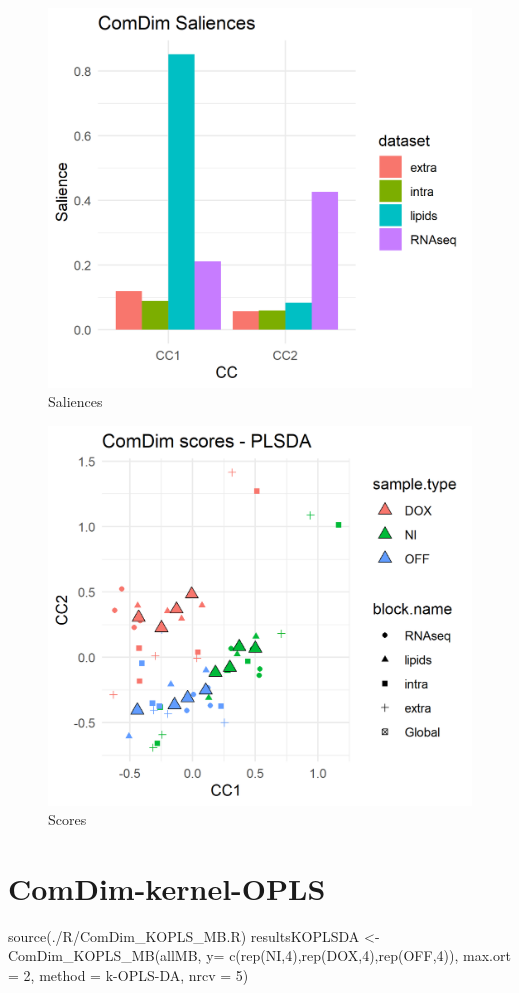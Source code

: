 \documentclass[
]{book}
\newenvironment{Shaded}{\begin{snugshade}}{\end{snugshade}}
\newcommand{\AttributeTok}[1]{\textcolor[rgb]{0.77,0.63,0.00}{#1}}
\newcommand{\DecValTok}[1]{\textcolor[rgb]{0.00,0.00,0.81}{#1}}
\newcommand{\FunctionTok}[1]{\textcolor[rgb]{0.00,0.00,0.00}{#1}}
\newcommand{\NormalTok}[1]{#1}
\newcommand{\OtherTok}[1]{\textcolor[rgb]{0.56,0.35,0.01}{#1}}
\newcommand{\StringTok}[1]{\textcolor[rgb]{0.31,0.60,0.02}{#1}}
\begin{document}
\begin{figure}

{\centering \includegraphics[width=0.5\linewidth]{Figs/fig6_1} 

}

\caption{Saliences}\label{fig:unnamed-chunk-16}
\end{figure}

\begin{figure}

{\centering \includegraphics[width=0.5\linewidth]{Figs/fig6_2} 

}

\caption{Scores}\label{fig:unnamed-chunk-17}
\end{figure}

\hypertarget{KOPLS}{%
\section{ComDim-kernel-OPLS}\label{KOPLS}}

\begin{Shaded}
\begin{Highlighting}[]
\FunctionTok{source}\NormalTok{(}\StringTok{\textquotesingle{}./R/ComDim\_KOPLS\_MB.R\textquotesingle{}}\NormalTok{)}
\NormalTok{resultsKOPLSDA }\OtherTok{\textless{}{-}} \FunctionTok{ComDim\_KOPLS\_MB}\NormalTok{(allMB, }\AttributeTok{y=} \FunctionTok{c}\NormalTok{(}\FunctionTok{rep}\NormalTok{(}\StringTok{\textquotesingle{}NI\textquotesingle{}}\NormalTok{,}\DecValTok{4}\NormalTok{),}\FunctionTok{rep}\NormalTok{(}\StringTok{\textquotesingle{}DOX\textquotesingle{}}\NormalTok{,}\DecValTok{4}\NormalTok{),}\FunctionTok{rep}\NormalTok{(}\StringTok{\textquotesingle{}OFF\textquotesingle{}}\NormalTok{,}\DecValTok{4}\NormalTok{)),}
                                  \AttributeTok{max.ort =} \DecValTok{2}\NormalTok{, }\AttributeTok{method =} \StringTok{\textquotesingle{}k{-}OPLS{-}DA\textquotesingle{}}\NormalTok{, }\AttributeTok{nrcv =} \DecValTok{5}\NormalTok{)}
\end{Highlighting}
\end{Shaded}
\end{document}
